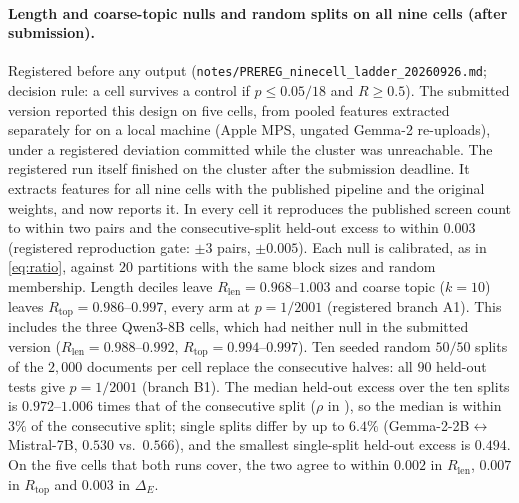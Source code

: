 \paragraph{Length and coarse-topic nulls and random splits on all nine cells (after submission).}\label{app:ninecell}
Registered before any output (\texttt{notes/PREREG\_ninecell\_ladder\_20260926.md}; decision rule: a
cell survives a control if $p\le0.05/18$ and $R\ge0.5$). The submitted version reported this design on
five cells, from pooled features extracted separately for  on a local machine (Apple
MPS, ungated Gemma-2 re-uploads), under a registered deviation committed while the cluster was
unreachable. The registered run itself finished on the cluster after the submission deadline. It
extracts features for all nine cells with the published pipeline and the original weights, and
 now reports it. In every cell it reproduces the published screen count to within
two pairs and the consecutive-split held-out excess to within $0.003$ (registered reproduction gate:
$\pm3$ pairs, $\pm0.005$). Each null is calibrated, as in \eqref{eq:ratio}, against $20$ partitions
with the same block sizes and random membership. Length deciles leave $R_{\text{len}}=0.968$--$1.003$
and coarse topic ($k{=}10$) leaves $R_{\text{top}}=0.986$--$0.997$, every arm at $p=1/2001$ (registered
branch A1). This includes the three Qwen3-8B cells, which had neither null in the submitted version
($R_{\text{len}}=0.988$--$0.992$, $R_{\text{top}}=0.994$--$0.997$). Ten seeded random $50/50$ splits of
the $2{,}000$ documents per cell replace the consecutive halves: all $90$ held-out tests give
$p=1/2001$ (branch B1). The median held-out excess over the ten splits is $0.972$--$1.006$ times that
of the consecutive split ($\rho$ in ), so the median is within $3\%$ of the
consecutive split; single splits differ by up to $6.4\%$ (Gemma-2-2B$\leftrightarrow$Mistral-7B, $0.530$
vs.\ $0.566$), and the smallest single-split held-out excess is $0.494$. On the five cells that both runs
cover, the two agree to within $0.002$ in $R_{\text{len}}$, $0.007$ in $R_{\text{top}}$ and $0.003$ in
$\Delta_E$.

